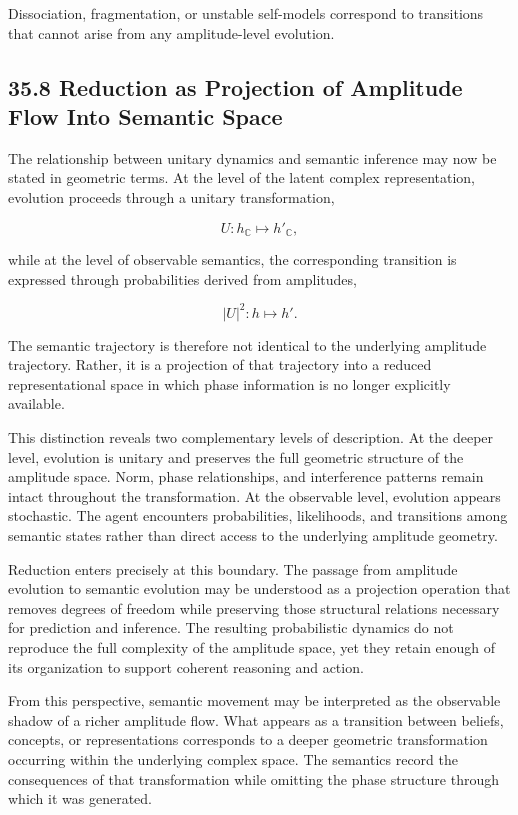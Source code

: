 \documentclass[12pt,letterpaper]{article}
\theoremstyle{remark}
\begin{document}
Dissociation, fragmentation, or unstable self-models correspond to transitions that cannot arise from any amplitude-level evolution.

\subsection{35.8 Reduction as Projection of Amplitude Flow Into Semantic Space}

The relationship between unitary dynamics and semantic inference may now be stated in geometric terms. At the level of the latent complex representation, evolution proceeds through a unitary transformation,

\[
U : h_{\mathbb{C}} \mapsto h'_{\mathbb{C}},
\]

while at the level of observable semantics, the corresponding transition is expressed through probabilities derived from amplitudes,

\[
|U|^2 : h \mapsto h'.
\]

The semantic trajectory is therefore not identical to the underlying amplitude trajectory. Rather, it is a projection of that trajectory into a reduced representational space in which phase information is no longer explicitly available.

This distinction reveals two complementary levels of description. At the deeper level, evolution is unitary and preserves the full geometric structure of the amplitude space. Norm, phase relationships, and interference patterns remain intact throughout the transformation. At the observable level, evolution appears stochastic. The agent encounters probabilities, likelihoods, and transitions among semantic states rather than direct access to the underlying amplitude geometry.

Reduction enters precisely at this boundary. The passage from amplitude evolution to semantic evolution may be understood as a projection operation that removes degrees of freedom while preserving those structural relations necessary for prediction and inference. The resulting probabilistic dynamics do not reproduce the full complexity of the amplitude space, yet they retain enough of its organization to support coherent reasoning and action.

From this perspective, semantic movement may be interpreted as the observable shadow of a richer amplitude flow. What appears as a transition between beliefs, concepts, or representations corresponds to a deeper geometric transformation occurring within the underlying complex space. The semantics record the consequences of that transformation while omitting the phase structure through which it was generated.
\end{document}
